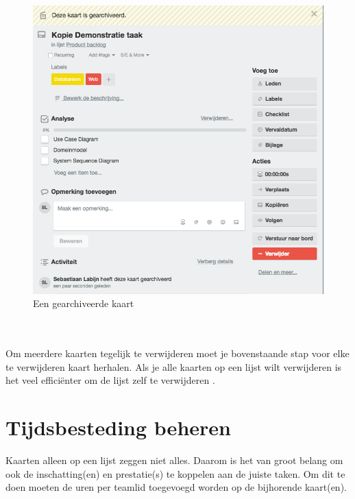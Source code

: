 \begin{figure}[h]
	\centering
	\includegraphics[scale=0.5]{./afbeeldingen/archiveer_kaart.png}
	\caption{Een gearchiveerde kaart}
	\label{fig:archiveer_kaart}	
\end{figure} 
\noindent
\\\\Om meerdere kaarten tegelijk te verwijderen moet je bovenstaande stap voor elke te verwijderen kaart herhalen.
Als je alle kaarten op een lijst wilt verwijderen is het veel effici\"enter om de lijst zelf te verwijderen .

\section{Tijdsbesteding beheren}\label{section:tijdsbesteding}

Kaarten alleen op een lijst zeggen niet alles. Daarom is het van groot belang om ook de inschatting(en) en prestatie(s) te koppelen aan de juiste taken. Om dit te doen moeten de uren per teamlid toegevoegd worden op de bijhorende kaart(en). 

